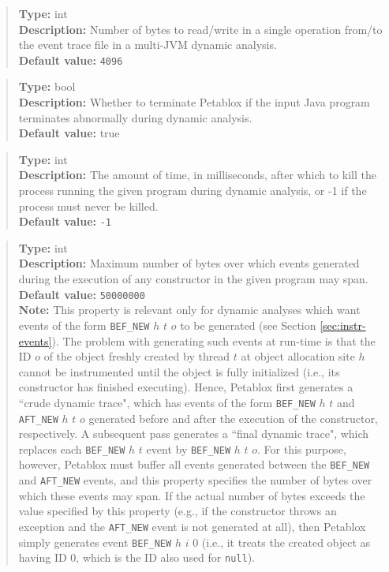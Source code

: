\begin{quote}
{\bf Type:} int \\
{\bf Description:} Number of bytes to read/write in a single operation from/to the event trace file in a multi-JVM dynamic analysis. \\
{\bf Default value:} {\tt 4096}
\end{quote}

\begin{quote}
{\bf Type:} bool \\
{\bf Description:} Whether to terminate Petablox if the input Java program terminates abnormally during dynamic analysis. \\
{\bf Default value:} true
\end{quote}

\begin{quote}
{\bf Type:} int  \\
{\bf Description:} The amount of time, in milliseconds, after which to kill the process running the given program during dynamic analysis, or -1 if the process must never be killed. \\
{\bf Default value:} {\tt -1}
\end{quote}

\begin{quote}
{\bf Type:} int \\
{\bf Description:} Maximum number of bytes over which events generated during the execution of any constructor in the given program may span. \\
{\bf Default value:} {\tt 50000000} \\
{\bf Note:} This property is relevant only for dynamic analyses which want events of the form {\tt BEF\_NEW} $h$ $t$ $o$ to be generated (see Section \ref{sec:instr-events}).  The problem with generating such events at run-time is that the ID $o$ of the object freshly created by thread $t$ at object allocation site $h$ cannot be instrumented until the object is fully initialized (i.e., its constructor has finished executing).  Hence, Petablox first generates a ``crude dynamic trace", which has events of the form {\tt BEF\_NEW} $h$ $t$ and {\tt AFT\_NEW} $h$ $t$ $o$ generated before and after the execution of the constructor, respectively.  A subsequent pass generates a ``final dynamic trace", which replaces each {\tt BEF\_NEW} $h$ $t$ event by {\tt BEF\_NEW} $h$ $t$ $o$.  For this purpose, however, Petablox must buffer all events generated between the {\tt BEF\_NEW} and {\tt AFT\_NEW} events, and this property specifies the number of bytes over which these events may span.  If the actual number of bytes exceeds the value specified by this property (e.g., if the constructor throws an exception and the {\tt AFT\_NEW} event is not generated at all), then Petablox simply generates event {\tt BEF\_NEW} $h$ $i$ $0$ (i.e., it treats the created object as having ID 0, which is the ID also used for {\tt null}). 
\end{quote}

